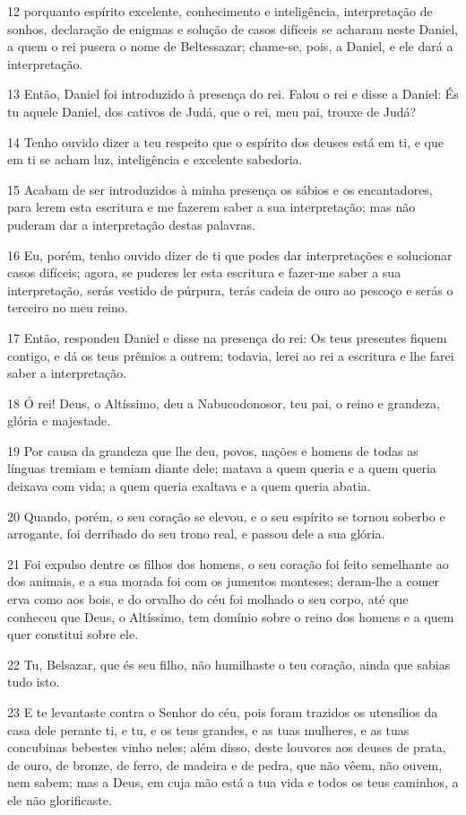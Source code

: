 \par 12 porquanto espírito excelente, conhecimento e inteligência, interpretação de sonhos, declaração de enigmas e solução de casos difíceis se acharam neste Daniel, a quem o rei pusera o nome de Beltessazar; chame-se, pois, a Daniel, e ele dará a interpretação.
\par 13 Então, Daniel foi introduzido à presença do rei. Falou o rei e disse a Daniel: És tu aquele Daniel, dos cativos de Judá, que o rei, meu pai, trouxe de Judá?
\par 14 Tenho ouvido dizer a teu respeito que o espírito dos deuses está em ti, e que em ti se acham luz, inteligência e excelente sabedoria.
\par 15 Acabam de ser introduzidos à minha presença os sábios e os encantadores, para lerem esta escritura e me fazerem saber a sua interpretação; mas não puderam dar a interpretação destas palavras.
\par 16 Eu, porém, tenho ouvido dizer de ti que podes dar interpretações e solucionar casos difíceis; agora, se puderes ler esta escritura e fazer-me saber a sua interpretação, serás vestido de púrpura, terás cadeia de ouro ao pescoço e serás o terceiro no meu reino.
\par 17 Então, respondeu Daniel e disse na presença do rei: Os teus presentes fiquem contigo, e dá os teus prêmios a outrem; todavia, lerei ao rei a escritura e lhe farei saber a interpretação.
\par 18 Ó rei! Deus, o Altíssimo, deu a Nabucodonosor, teu pai, o reino e grandeza, glória e majestade.
\par 19 Por causa da grandeza que lhe deu, povos, nações e homens de todas as línguas tremiam e temiam diante dele; matava a quem queria e a quem queria deixava com vida; a quem queria exaltava e a quem queria abatia.
\par 20 Quando, porém, o seu coração se elevou, e o seu espírito se tornou soberbo e arrogante, foi derribado do seu trono real, e passou dele a sua glória.
\par 21 Foi expulso dentre os filhos dos homens, o seu coração foi feito semelhante ao dos animais, e a sua morada foi com os jumentos monteses; deram-lhe a comer erva como aos bois, e do orvalho do céu foi molhado o seu corpo, até que conheceu que Deus, o Altíssimo, tem domínio sobre o reino dos homens e a quem quer constitui sobre ele.
\par 22 Tu, Belsazar, que és seu filho, não humilhaste o teu coração, ainda que sabias tudo isto.
\par 23 E te levantaste contra o Senhor do céu, pois foram trazidos os utensílios da casa dele perante ti, e tu, e os teus grandes, e as tuas mulheres, e as tuas concubinas bebestes vinho neles; além disso, deste louvores aos deuses de prata, de ouro, de bronze, de ferro, de madeira e de pedra, que não vêem, não ouvem, nem sabem; mas a Deus, em cuja mão está a tua vida e todos os teus caminhos, a ele não glorificaste.
